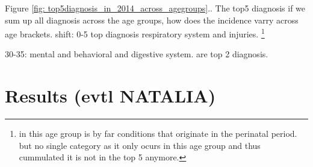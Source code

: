 \documentclass[11pt, a4paper]{article} %
\begin{document}
Figure \ref{fig: top5diagnosis_in_2014_across_agegroups}..
The top5 diagnosis if we sum up all diagnosis across the age groups, how does the incidence varry across age brackets.
shift: 
0-5 top diagnosis respiratory system and injuries. \footnote{ in this age group is by far conditions that originate in the perinatal period. but no single category as it only ocurs in this age group and thus cummulated it is not in the top 5 anymore. }

30-35: mental and behavioral and digestive system. are top 2 diagnosis.




\section{Results (evtl NATALIA)}\label{sec:results}
\end{document}
